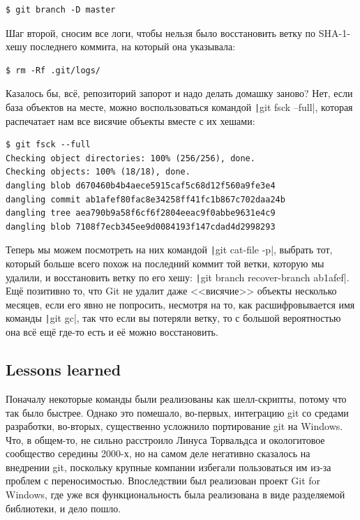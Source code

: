 \documentclass[a5paper]{article}
\begin{document}
\begin{verbatim}
$ git branch -D master
\end{verbatim}

Шаг второй, сносим все логи, чтобы нельзя было восстановить ветку по SHA-1-хешу последнего коммита, на который она указывала:

\begin{verbatim}
$ rm -Rf .git/logs/
\end{verbatim}

Казалось бы, всё, репозиторий запорот и надо делать домашку заново? Нет, если база объектов на месте, можно воспользоваться командой \texttt|git fsck --full|, которая распечатает нам все висячие объекты вместе с их хешами:

\begin{verbatim}
$ git fsck --full
Checking object directories: 100% (256/256), done.
Checking objects: 100% (18/18), done.
dangling blob d670460b4b4aece5915caf5c68d12f560a9fe3e4
dangling commit ab1afef80fac8e34258ff41fc1b867c702daa24b
dangling tree aea790b9a58f6cf6f2804eeac9f0abbe9631e4c9
dangling blob 7108f7ecb345ee9d0084193f147cdad4d2998293
\end{verbatim}

Теперь мы можем посмотреть на них командой \texttt|git cat-file -p|, выбрать тот, который больше всего похож на последний коммит той ветки, которую мы удалили, и восстановить ветку по его хешу: \texttt|git branch recover-branch ab1afef|. Ещё позитивно то, что Git не удалит даже <<висячие>> объекты несколько месяцев, если его явно не попросить, несмотря на то, как расшифровывается имя команды \texttt|git gc|, так что если вы потеряли ветку, то с большой вероятностью она всё ещё где-то есть и её можно восстановить.

\subsection{Lessons learned}

Поначалу некоторые команды были реализованы как шелл-скрипты, потому что так было быстрее. Однако это помешало, во-первых, интеграцию git со средами разработки, во-вторых, существенно усложнило портирование git на Windows. Что, в общем-то, не сильно расстроило Линуса Торвальдса и окологитовое сообщество середины 2000-х, но на самом деле негативно сказалось на внедрении git, поскольку крупные компании избегали пользоваться им из-за проблем с переносимостью. Впоследствии был реализован проект Git for Windows, где уже вся функциональность была реализована в виде разделяемой библиотеки, и дело пошло.
\end{document}

